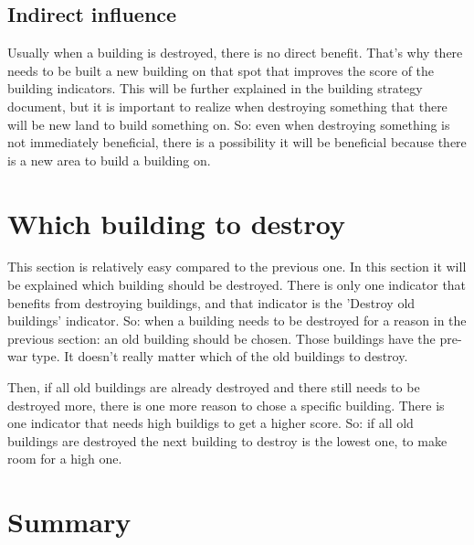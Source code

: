 \documentclass{article}
\begin{document}
\subsection{Indirect influence}
Usually when a building is destroyed, there is no direct benefit. That's why there needs to be built a new building on that spot that improves the score of the building indicators. This will be further explained in the building strategy document, but it is important to realize when destroying something that there will be new land to build something on. So: even when destroying something is not immediately beneficial, there is a possibility it will be beneficial because there is a new area to build a building on.

\section{Which building to destroy}
This section is relatively easy compared to the previous one. In this section it will be explained which building should be destroyed. There is only one indicator that benefits from destroying buildings, and that indicator is the 'Destroy old buildings' indicator. So: when a building needs to be destroyed for a reason in the previous section: an old building should be chosen. Those buildings have the pre-war type. It doesn't really matter which of the old buildings to destroy. 

Then, if all old buildings are already destroyed and there still needs to be destroyed more, there is one more reason to chose a specific building. There is one indicator that needs high buildigs to get a higher score. So: if all old buildings are destroyed the next building to destroy is the lowest one, to make room for a high one.

\section{Summary}
\end{document}
